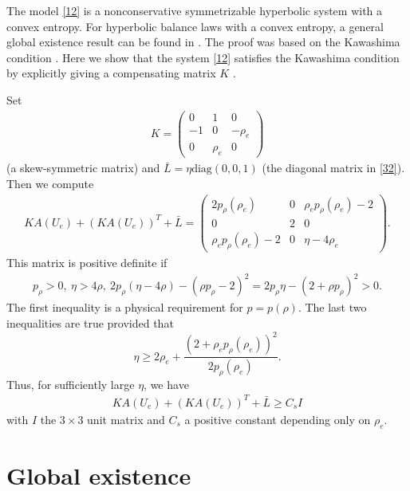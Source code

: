 \documentclass{article}
\theoremstyle{plain}
\begin{document}
The model \eqref{12} is a nonconservative symmetrizable hyperbolic system with a convex entropy. For hyperbolic balance laws with a convex entropy, a general global existence result can be found in \cite{yong2004entropy,hanouzet2003global}. The proof was based on the Kawashima condition \cite{kawashima1985systems}.
Here we show that the system \eqref{12} satisfies the Kawashima condition by explicitly giving a compensating matrix $K$ \cite{kawashima1985systems}.

Set
\begin{eqnarray}\label{33}
K=\left( \begin{array}{ccc}
	0 & 1 & 0 \\
	-1 & 0 & -\rho_e \\
	0 & \rho_e & 0
	\end{array} \right)
\end{eqnarray}
(a skew-symmetric matrix) and $\bar{L} = \eta\mbox{diag}(0, 0, 1)$ (the diagonal matrix in \eqref{32}). Then we compute
\begin{eqnarray*}
K A(U_e) + (K A(U_e))^T + \bar{L} =
	\left( \begin{array}{ccc}
	2p_\rho(\rho_e) & 0 & \rho_e p_\rho(\rho_e) -2  \\
	0 & 2 & 0 \\
	\rho_e p_\rho(\rho_e) - 2 & 0 & \eta -4\rho_e 	
	\end{array} \right).
\end{eqnarray*}
This matrix is positive definite if
\begin{eqnarray*}
p_\rho > 0, \ \eta >4\rho, \ 2p_\rho(\eta - 4\rho)-(\rho p_{\rho}-2)^2 = 2 p_\rho\eta  - (2 + \rho p_\rho)^2 >0.
\end{eqnarray*}
The first inequality is a physical requirement for $p=p(\rho)$. The last two inequalities are true provided that
$$
\eta \geq 2\rho_e +\frac{(2 + \rho_e p_\rho(\rho_e))^2}{2 p_\rho(\rho_e)}.
$$
Thus, for sufficiently large $\eta$, we have
\begin{eqnarray}\label{35}
K A(U_e) + (K A(U_e))^T + \bar{L} \ge C_s I
\end{eqnarray}
with $I$ the $3 \times 3$ unit matrix and $C_s$ a positive constant depending only on $\rho_e$.

\section{Global existence}
\setcounter{equation}{0}
\end{document}
